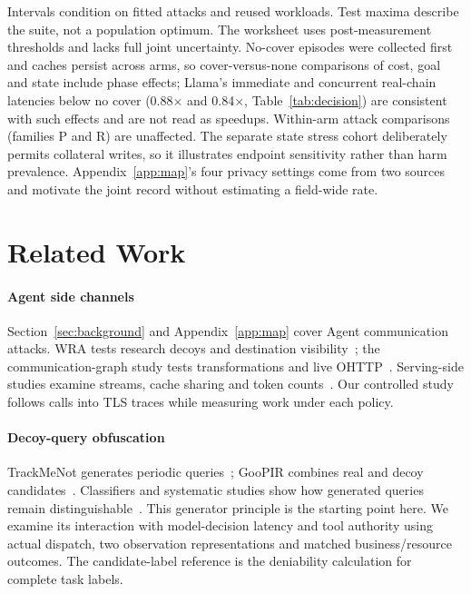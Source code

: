 Intervals condition on fitted attacks and reused workloads. Test maxima describe the suite, not a population optimum. The worksheet uses post-measurement thresholds and lacks full joint uncertainty. No-cover episodes were collected first and caches persist across arms, so cover-versus-none comparisons of cost, goal and state include phase effects; Llama's immediate and concurrent real-chain latencies below no cover (0.88$\times$ and 0.84$\times$, Table~\ref{tab:decision}) are consistent with such effects and are not read as speedups. Within-arm attack comparisons (families P and R) are unaffected. The separate state stress cohort deliberately permits collateral writes, so it illustrates endpoint sensitivity rather than harm prevalence. Appendix~\ref{app:map}'s four privacy settings come from two sources and motivate the joint record without estimating a field-wide rate.

\section{Related Work}\label{sec:related}
\paragraph{Agent side channels}
Section~\ref{sec:background} and Appendix~\ref{app:map} cover Agent communication attacks. WRA tests research decoys and destination visibility~\cite{jeong2026wra}; the communication-graph study tests transformations and live OHTTP~\cite{dangol2026workflow}. Serving-side studies examine streams, cache sharing and token counts~\cite{weiss2024prompt,whisperleak2025,earlybird2025,timewilltell2024,carlini2024timing,wu2026cacheprune}. Our controlled study follows calls into TLS traces while measuring work under each policy.

\paragraph{Decoy-query obfuscation}
TrackMeNot generates periodic queries~\cite{howe2008trackmenot}; GooPIR combines real and decoy candidates~\cite{domingoferrer2009goopir}. Classifiers and systematic studies show how generated queries remain distinguishable~\cite{peddinti2010trackmenot,balsa2012obpws,gervais2014websearch}. This generator principle is the starting point here. We examine its interaction with model-decision latency and tool authority using actual dispatch, two observation representations and matched business/resource outcomes. The candidate-label reference is the deniability calculation for complete task labels.

